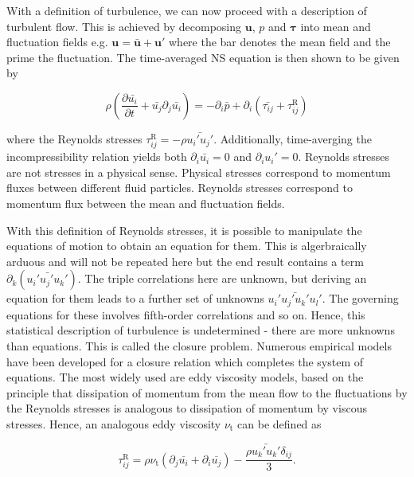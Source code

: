 \documentclass[12pt]{article}
\begin{document}
With a definition of turbulence, we can now proceed with a description of turbulent flow. This is achieved by decomposing $\boldsymbol{u}$, $p$ and $\boldsymbol{\tau}$ into mean and fluctuation fields e.g. $\boldsymbol{u} = \boldsymbol{\bar{u}} + \boldsymbol{u'}$ where the bar denotes the mean field and the prime the fluctuation. The time-averaged NS equation is then shown to be given by

\begin{equation}
\label{equ:TA-NS}
\rho \left(\frac{\partial \bar{u_{i}}}{\partial t} + \bar{u_{j}} \partial_{j} \bar{u_{i}}\right) = - \partial_{i} \bar{p} + \partial_{i}(\bar{\tau_{ij}} + \tau_{ij}^{\text{R}}) 
\end{equation}

where the Reynolds stresses $\tau_{ij}^{\text{R}} = -\rho \bar{u_{i}'u_{j}'}$. Additionally, time-averging the incompressibility relation yields both $\partial_{i} \bar{u_{i}} = 0$ and $\partial_{i} u_{i}' = 0$. Reynolds stresses are not stresses in a physical sense. Physical stresses correspond to momentum fluxes between different fluid particles. Reynolds stresses correspond to momentum flux between the mean and fluctuation fields. 

With this definition of Reynolds stresses, it is possible to manipulate the equations of motion to obtain an equation for them. This is algerbraically arduous and will not be repeated here but the end result contains a term $\partial_{k} (\bar{u_{i}' u_{j}' u_{k}'})$. The triple correlations here are unknown, but deriving an equation for them leads to a further set of unknowns $\bar{u_{i}' u_{j}' u_{k}' u_{l}'}$. The governing equations for these involves fifth-order correlations and so on. Hence, this statistical description of turbulence is undetermined - there are more unknowns than equations. This is called the closure problem. Numerous empirical models have been developed for a closure relation which completes the system of equations. The most widely used are eddy viscosity models, based on the principle that dissipation of momentum from the mean flow to the fluctuations by the Reynolds stresses is analogous to dissipation of momentum by viscous stresses. Hence, an analogous eddy viscosity $\nu_{\text{t}}$ can be defined as \citep{Boussinesq87}

\begin{equation}
\label{equ:eddy_viscos}
\tau_{ij}^{\text{R}} = \rho \nu_{\text{t}} (\partial_{j} \bar{u_{i}} + \partial_{i} \bar{u_{j}}) - \frac{\rho \bar{u_{k}' u_{k}'} \delta_{ij}}{3}.
\end{equation}
\end{document}

